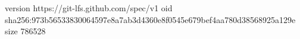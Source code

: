 version https://git-lfs.github.com/spec/v1
oid sha256:973b56533830064597e8a7ab3d4360e8f0545e679bef4aa780d38568925a129e
size 786528
